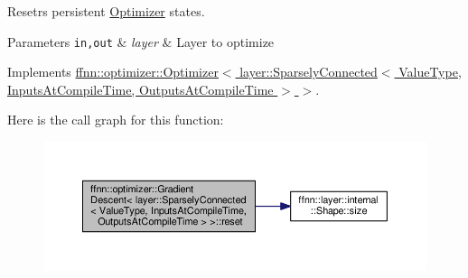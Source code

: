 Resetrs persistent \hyperlink{classffnn_1_1optimizer_1_1_optimizer}{Optimizer} states. 


\begin{DoxyParams}[1]{Parameters}
\mbox{\tt in,out}  & {\em layer} & Layer to optimize \\
\hline
\end{DoxyParams}


Implements \hyperlink{classffnn_1_1optimizer_1_1_optimizer_ade04e7582eb7b833713a9bd33e0e8346}{ffnn\-::optimizer\-::\-Optimizer$<$ layer\-::\-Sparsely\-Connected$<$ Value\-Type, Inputs\-At\-Compile\-Time, Outputs\-At\-Compile\-Time $>$ $>$}.



Here is the call graph for this function\-:
\nopagebreak
\begin{figure}[H]
\begin{center}
\leavevmode
\includegraphics[width=350pt]{classffnn_1_1optimizer_1_1_gradient_descent_3_01layer_1_1_sparsely_connected_3_01_value_type_00_e6c27913ab0d90f52f73031aa88c19bf_a61e4190921d10b1ec15f0a710b12df22_cgraph}
\end{center}
\end{figure}


